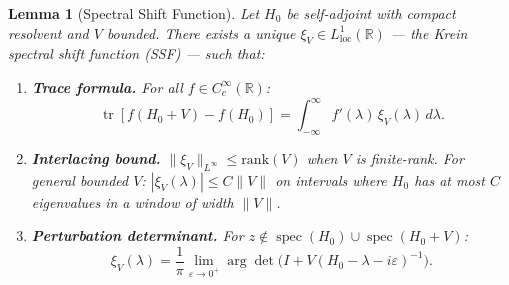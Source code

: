 \documentclass[11pt,a4paper]{article}
\theoremstyle{plain}
\newtheorem{lemma}[theorem]{Lemma}
\theoremstyle{remark}
\newcommand{\R}{\mathbb{R}}
\DeclareMathOperator{\tr}{tr}
\DeclareMathOperator{\spec}{spec}
\newcommand{\norm}[1]{\lVert #1 \rVert}
\begin{document}
\begin{lemma}[Spectral Shift Function]\label{lem:ssf}
Let $H_0$ be self-adjoint with compact resolvent and $V$ bounded. There
exists a unique $\xi_V\in L^1_{\mathrm{loc}}(\R)$ --- the
\emph{Krein spectral shift function} (SSF) --- such that:

\begin{enumerate}[nosep,label=(\alph*)]
  \item \textbf{Trace formula.}  For all $f\in C_c^\infty(\R)$:
        \begin{equation}\label{eq:birman-krein}
          \tr[f(H_0+V)-f(H_0)]=\int_{-\infty}^\infty f'(\lambda)\,\xi_V(\lambda)\,d\lambda.
        \end{equation}

  \item \textbf{Interlacing bound.}
        $\norm{\xi_V}_{L^\infty}\leq\mathrm{rank}(V)$ when $V$ is
        finite-rank.  For general bounded $V$:
        $|\xi_V(\lambda)|\leq C\norm{V}$ on intervals where $H_0$
        has at most $C$ eigenvalues in a window of width $\norm{V}$.

  \item \textbf{Perturbation determinant.}  For $z\notin\spec(H_0)
        \cup\spec(H_0+V)$:
        \begin{equation}\label{eq:pert-det}
          \xi_V(\lambda)=\frac{1}{\pi}\lim_{\varepsilon\to 0^+}
          \arg\det\bigl(I+V(H_0-\lambda-i\varepsilon)^{-1}\bigr).
        \end{equation}
\end{enumerate}
\end{lemma}
\end{document}
